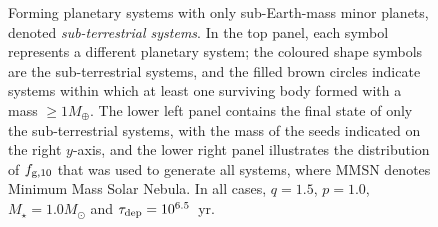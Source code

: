 \documentclass[useAMS,usenatbib]{mn2e}
\begin{document}
\begin{figure}
{}
\caption{
Forming planetary systems with only sub-Earth-mass minor planets, denoted {\it sub-terrestrial systems}. In the top panel, each symbol represents a different planetary system; the coloured shape symbols are the sub-terrestrial systems, and the filled brown circles indicate systems within which at least one surviving body formed with a mass $\ge 1M_{\oplus}$. The lower left panel contains the final state of only the sub-terrestrial systems, with the mass of the seeds indicated on the right $y$-axis, and the lower right panel illustrates the distribution of $f_{\rm g,10}$ that was used to generate all systems, where MMSN denotes Minimum Mass Solar Nebula. In all cases, $q=1.5$, $p=1.0$, $M_{\star} = 1.0M_{\odot}$ and $\tau_{\rm dep} = 10^{6.5}$~yr.
}
\label{FigFiducial}
\end{figure}
\end{document}
